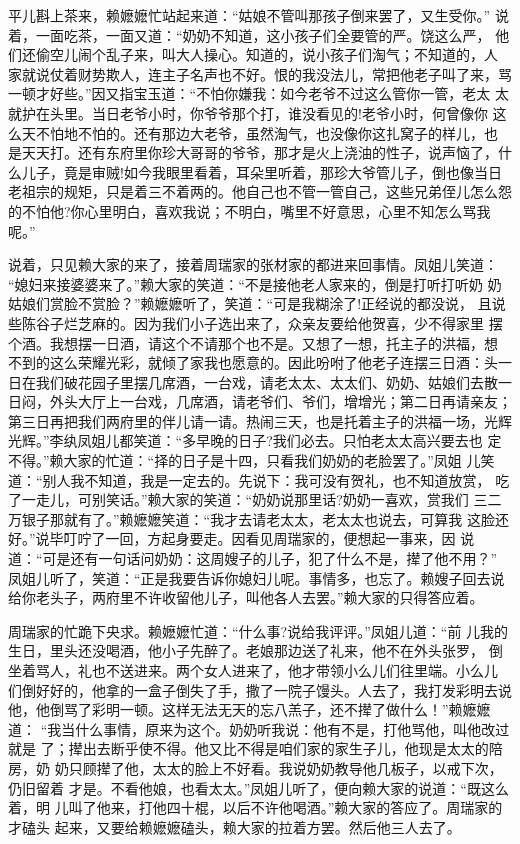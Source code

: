 平儿斟上茶来，赖嬷嬷忙站起来道：“姑娘不管叫那孩子倒来罢了，又生受你。”
说着，一面吃茶，一面又道：“奶奶不知道，这小孩子们全要管的严。饶这么严，
他们还偷空儿闹个乱子来，叫大人操心。知道的，说小孩子们淘气；不知道的，人
家就说仗着财势欺人，连主子名声也不好。恨的我没法儿，常把他老子叫了来，骂
一顿才好些。”因又指宝玉道：“不怕你嫌我：如今老爷不过这么管你一管，老太
太就护在头里。当日老爷小时，你爷爷那个打，谁没看见的!老爷小时，何曾像你
这么天不怕地不怕的。还有那边大老爷，虽然淘气，也没像你这扎窝子的样儿，也
是天天打。还有东府里你珍大哥哥的爷爷，那才是火上浇油的性子，说声恼了，什
么儿子，竟是审贼!如今我眼里看着，耳朵里听着，那珍大爷管儿子，倒也像当日
老祖宗的规矩，只是着三不着两的。他自己也不管一管自己，这些兄弟侄儿怎么怨
的不怕他?你心里明白，喜欢我说；不明白，嘴里不好意思，心里不知怎么骂我呢。”

说着，只见赖大家的来了，接着周瑞家的张材家的都进来回事情。凤姐儿笑道：
“媳妇来接婆婆来了。”赖大家的笑道：“不是接他老人家来的，倒是打听打听奶
奶姑娘们赏脸不赏脸？”赖嬷嬷听了，笑道：“可是我糊涂了!正经说的都没说，
且说些陈谷子烂芝麻的。因为我们小子选出来了，众亲友要给他贺喜，少不得家里
摆个酒。我想摆一日酒，请这个不请那个也不是。又想了一想，托主子的洪福，想
不到的这么荣耀光彩，就倾了家我也愿意的。因此吩咐了他老子连摆三日酒：头一
日在我们破花园子里摆几席酒，一台戏，请老太太、太太们、奶奶、姑娘们去散一
日闷，外头大厅上一台戏，几席酒，请老爷们、爷们，增增光；第二日再请亲友；
第三日再把我们两府里的伴儿请一请。热闹三天，也是托着主子的洪福一场，光辉
光辉。”李纨凤姐儿都笑道：“多早晚的日子?我们必去。只怕老太太高兴要去也
定不得。”赖大家的忙道：“择的日子是十四，只看我们奶奶的老脸罢了。”凤姐
儿笑道：“别人我不知道，我是一定去的。先说下：我可没有贺礼，也不知道放赏，
吃了一走儿，可别笑话。”赖大家的笑道：“奶奶说那里话?奶奶一喜欢，赏我们
三二万银子那就有了。”赖嬷嬷笑道：“我才去请老太太，老太太也说去，可算我
这脸还好。”说毕叮咛了一回，方起身要走。因看见周瑞家的，便想起一事来，因
说道：“可是还有一句话问奶奶：这周嫂子的儿子，犯了什么不是，撵了他不用？”
凤姐儿听了，笑道：“正是我要告诉你媳妇儿呢。事情多，也忘了。赖嫂子回去说
给你老头子，两府里不许收留他儿子，叫他各人去罢。”赖大家的只得答应着。

周瑞家的忙跪下央求。赖嬷嬷忙道：“什么事?说给我评评。”凤姐儿道：“前
儿我的生日，里头还没喝酒，他小子先醉了。老娘那边送了礼来，他不在外头张罗，
倒坐着骂人，礼也不送进来。两个女人进来了，他才带领小么儿们往里端。小么儿
们倒好好的，他拿的一盒子倒失了手，撒了一院子馒头。人去了，我打发彩明去说
他，他倒骂了彩明一顿。这样无法无天的忘八羔子，还不撵了做什么！”赖嬷嬷道：
“我当什么事情，原来为这个。奶奶听我说：他有不是，打他骂他，叫他改过就是
了；撵出去断乎使不得。他又比不得是咱们家的家生子儿，他现是太太的陪房，奶
奶只顾撵了他，太太的脸上不好看。我说奶奶教导他几板子，以戒下次，仍旧留着
才是。不看他娘，也看太太。”凤姐儿听了，便向赖大家的说道：“既这么着，明
儿叫了他来，打他四十棍，以后不许他喝酒。”赖大家的答应了。周瑞家的才磕头
起来，又要给赖嬷嬷磕头，赖大家的拉着方罢。然后他三人去了。

